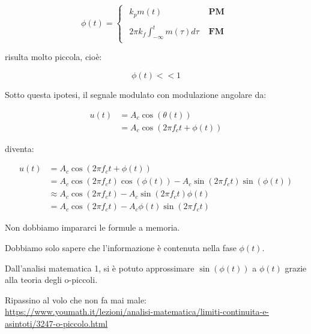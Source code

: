 {
    \Large 
    \begin{equation}
        \phi (t)
        = 
        \begin{cases}
            \begin{array}{ll}
            k_p m(t) & \textbf{ PM} 
            \\
            \\
            2 \pi k_f \int_{-\infty}^{t} m(\tau) d\tau & \textbf{ FM}
            \end{array} 
        \end{cases}
    \end{equation}
}

risulta molto piccola, cioè: 

{
    \Large 
    \begin{equation}
        \phi (t) << 1
    \end{equation}
}

Sotto questa ipotesi, il segnale modulato con modulazione angolare da: 

{
    \Large 
    \begin{equation}
        \begin{split}
            u(t)
            &= 
            A_c \cos(\theta (t))
            \\
            &= 
            A_c \cos(2 \pi f_c t + \phi(t))
        \end{split}
    \end{equation}
}

diventa: 

{
    \Large
    \begin{equation}
        \begin{split}
        u(t)
        &= 
        A_c \cos(2 \pi f_c t + \phi (t))   
        \\
        &= 
        A_c \cos(2\pi f_c t) \cos(\phi (t)) 
        - 
        A_c \sin(2\pi f_c t) \sin(\phi (t))
        \\
        &\approx
        A_c \cos(2\pi f_c t)  
        - 
        A_c \sin(2\pi f_c t) \phi (t)
        \\
        &= 
        A_c \cos(2\pi f_c t)  
        - 
        A_c \phi (t) \sin(2\pi f_c t) 
    \end{split}
    \end{equation}
}

\begin{tcolorbox}
Non dobbiamo impararci le formule a memoria. \newline 

Dobbiamo solo sapere che l'informazione è contenuta nella fase $\phi (t)$. \newline

    Dall'analisi matematica 1, 
    si è potuto approssimare $\sin(\phi(t))$ a $\phi (t)$ grazie alla teoria degli o-piccoli. \newline 

    Ripassino al volo che non fa mai male: \\
    \url{https://www.youmath.it/lezioni/analisi-matematica/limiti-continuita-e-asintoti/3247-o-piccolo.html}
\end{tcolorbox}

